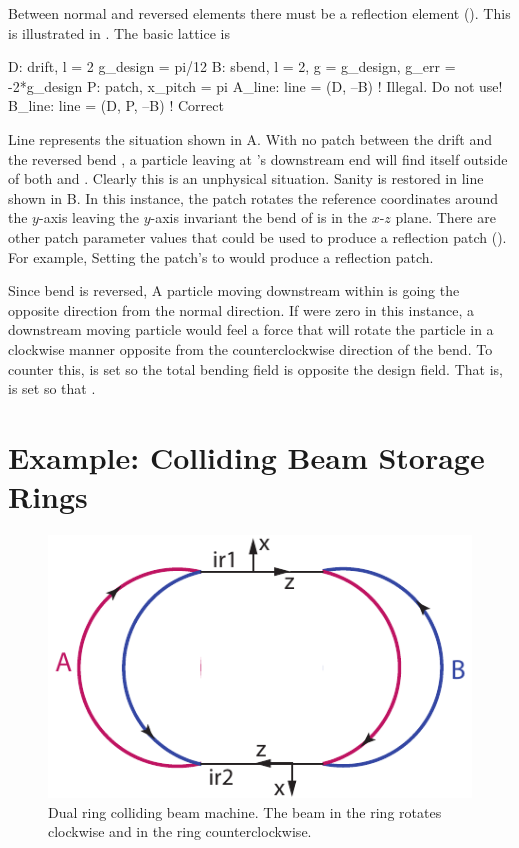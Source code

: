 Between normal and reversed elements there must be a reflection
 element ().  This is illustrated in
. The basic lattice is
\begin{example}
  D: drift, l = 2
  g_design = pi/12
  B: sbend, l = 2, g = g_design, g_err = -2*g_design
  P: patch, x_pitch = pi
  A_line: line = (D, --B)     ! Illegal. Do not use!
  B_line: line = (D, P, --B)  ! Correct
\end{example}
Line  represents the situation shown in
A.  With no patch between the drift  and
the reversed bend , a particle leaving  at 's
downstream end will find itself outside of both  and
. Clearly this is an unphysical situation. Sanity is restored in
line  shown in B. In this instance, the
patch  rotates the reference coordinates around the $y$-axis
leaving the $y$-axis invariant the bend of  is in the $x$-$z$
plane. There are other patch parameter values that could be used to
produce a reflection patch ().  For example,
Setting the patch's  to  would produce a reflection
patch.

Since bend  is reversed, A particle moving downstream within
 is going the opposite direction from the normal direction. If
 were zero in this instance, a downstream moving particle
would feel a force that will rotate the particle in a clockwise manner
opposite from the counterclockwise direction of the bend. To counter
this,  is set so the total bending field  is opposite the design field. That is,  is set so
that .

\section{Example: Colliding Beam Storage Rings}
\label{s:ex.collide}

\begin{figure}[tb]
  \centering
  \includegraphics[width=5in]{colliding-beams.pdf}
  \caption[Dual ring colliding beam machine]{Dual ring colliding beam machine. 
The beam in the  ring rotates clockwise and in the  ring
counterclockwise.}
  \label{f:collide}
\end{figure}

